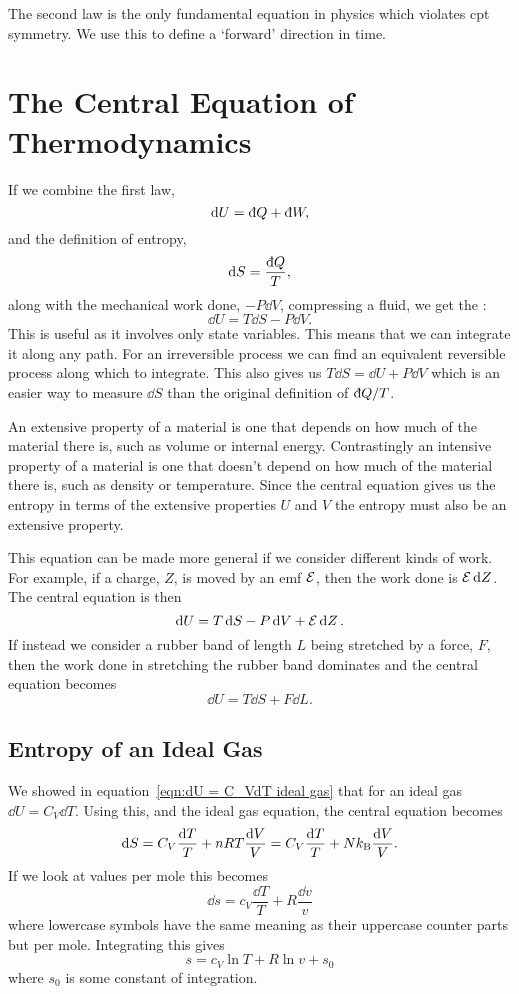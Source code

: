    The second law is the only fundamental equation in physics which violates \gls{cpt} symmetry.
    We use this to define a `forward' direction in time.
    
    \section{The Central Equation of Thermodynamics}
    If we combine the first law,
    \[\dd{U} = \ddbar{Q} + \ddbar{W},\]
    and the definition of entropy,
    \[\dd{S} = \frac{\ddbar{Q}}{T},\]
    along with the mechanical work done, \(-P\dd{V}\), compressing a fluid, we get the :
    \[\dd{U} = T\dd{S} - P\dd{V}.\]
    This is useful as it involves only state variables.
    This means that we can integrate it along any path.
    For an irreversible process we can find an equivalent reversible process along which to integrate.
    This also gives us \(T\dd{S} = \dd{U} + P\dd{V}\) which is an easier way to measure \(\dd{S}\) than the original definition of \(\ddbar{Q}/T\).
    
    An extensive property of a material is one that depends on how much of the material there is, such as volume or internal energy.
    Contrastingly an intensive property of a material is one that doesn't depend on how much of the material there is, such as density or temperature.
    Since the central equation gives us the entropy in terms of the extensive properties \(U\) and \(V\) the entropy must also be an extensive property.
    
    This equation can be made more general if we consider different kinds of work.
    For example, if a charge, \(Z\), is moved by an emf \(\mathcal{E}\), then the work done is \(\mathcal{E}\dd{Z}\).
    The central equation is then
    \[\dd{U} = T\dd{S} - P\dd{V} + \mathcal{E}\dd{Z}.\]
    If instead we consider a rubber band of length \(L\) being stretched by a force, \(F\), then the work done in stretching the rubber band dominates and the central equation becomes
    \[\dd{U} = T\dd{S} + F\dd{L}.\]
    
    \subsection{Entropy of an Ideal Gas}
    We showed in equation~\ref{eqn:dU = C_VdT ideal gas} that for an ideal gas \(\dd{U} = C_V\dd{T}\).
    Using this, and the ideal gas equation, the central equation becomes
    \[\dd{S} = C_V\frac{\dd{T}}{T} + nRT\frac{\dd{V}}{V} = C_V\frac{\dd{T}}{T} + Nk_\mathrm{B}\frac{\dd{V}}{V}.\]
    If we look at values per mole this becomes
    \[\dd{s} = c_V\frac{\dd{T}}{T} + R\frac{\dd{v}}{v}\]
    where lowercase symbols have the same meaning as their uppercase counter parts but per mole.
    Integrating this gives
    \[s = c_V\ln T + R\ln v + s_0\]
    where \(s_0\) is some constant of integration.
    
